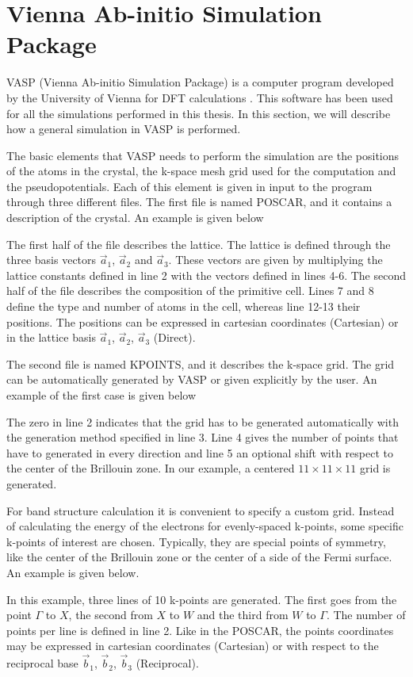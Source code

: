 \section{Vienna Ab-initio Simulation Package}
VASP (Vienna Ab-initio Simulation Package) is a computer program  developed by the University of Vienna for DFT calculations \cite{kresse1993,kresse1996,kresse1996a,kresse1999}. This software has been used for all the simulations performed in this thesis. In this section, we will describe how a general simulation in VASP is performed.

The basic elements that VASP needs to perform the simulation are the positions of the atoms in the crystal, the k-space mesh grid used for the computation and the pseudopotentials. Each of this element is given in input to the program through three different files. The first file is named POSCAR, and it contains a description of the crystal. An example is given below

The first half of the file describes the lattice. The lattice is defined through the three basis vectors $\vec{a}_1$, $\vec{a}_2$ and $\vec{a}_3$. These vectors are given by multiplying the lattice constants defined in line 2 with the vectors defined in lines 4-6. The second half of the file describes the composition of the primitive cell. Lines 7 and 8 define the type and number of atoms in the cell, whereas line 12-13 their positions. The positions can be expressed in cartesian coordinates (Cartesian) or in the lattice basis $\vec{a}_1$, $\vec{a}_2$, $\vec{a}_3$ (Direct).

The second file is named KPOINTS, and it describes the k-space grid. The grid can be automatically generated by VASP or given explicitly by the user. An example of the first case is given below

The zero in line 2 indicates that the grid has to be generated automatically with the generation method specified in line 3. Line 4 gives the number of points that have to generated in every direction and line 5 an optional shift with respect to the center of the Brillouin zone. In our example, a centered $11\times11\times11$ grid is generated.

For band structure calculation it is convenient to specify a custom grid. Instead of calculating the energy of the electrons for evenly-spaced k-points, some specific k-points of interest are chosen. Typically, they are special points of symmetry, like the center of the Brillouin zone or the center of a side of the Fermi surface. An example is given below.

In this example, three lines of 10 k-points are generated. The first goes from the point $\Gamma$ to $X$, the second from $X$ to $W$ and the third from $W$ to $\Gamma$. The number of points per line is defined in line 2. Like in the POSCAR, the points coordinates may be expressed in cartesian coordinates (Cartesian) or with respect to the reciprocal base $\vec{b}_1$, $\vec{b}_2$, $\vec{b}_3$ (Reciprocal).


